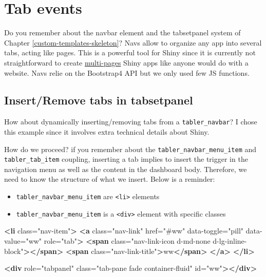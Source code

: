 \documentclass[]{book}
\newenvironment{Shaded}{\begin{snugshade}}{\end{snugshade}}
\newcommand{\KeywordTok}[1]{\textcolor[rgb]{0.13,0.29,0.53}{\textbf{#1}}}
\newcommand{\NormalTok}[1]{#1}
\newcommand{\OtherTok}[1]{\textcolor[rgb]{0.56,0.35,0.01}{#1}}
\newcommand{\StringTok}[1]{\textcolor[rgb]{0.31,0.60,0.02}{#1}}
\providecommand{\tightlist}{%
  \setlength{\itemsep}{0pt}\setlength{\parskip}{0pt}}
\begin{document}
\hypertarget{tab-events}{%
\section{Tab events}\label{tab-events}}

Do you remember about the navbar element and the tabsetpanel system of Chapter \ref{custom-templates-skeleton}? Navs allow to organize any app into several tabs, acting like pages. This is a powerful tool for Shiny since it is currently not straightforward to create \href{https://community.rstudio.com/t/shiny-app-composed-of-many-many-pages/7698}{multi-pages} Shiny apps like anyone would do with a website. Navs relie on the Bootstrap4 API but we only used few JS functions.

\hypertarget{insert-tabs}{%
\subsection{Insert/Remove tabs in tabsetpanel}\label{insert-tabs}}

How about dynamically inserting/removing tabs from a \texttt{tabler\_navbar}? I chose this example since it involves extra technical details about Shiny.

How do we proceed? if you remember about the \texttt{tabler\_navbar\_menu\_item} and \texttt{tabler\_tab\_item} coupling, inserting a tab implies to insert the trigger in the navigation menu as well as the content in the dashboard body. Therefore, we need to know the structure of what we insert. Below is a reminder:

\begin{itemize}
\tightlist
\item
  \texttt{tabler\_navbar\_menu\_item} are \texttt{\textless{}li\textgreater{}} elements
\item
  \texttt{tabler\_navbar\_menu\_item} is a \texttt{\textless{}div\textgreater{}} element with specific classes
\end{itemize}

\begin{Shaded}
\begin{Highlighting}[]
\KeywordTok{<li}\OtherTok{ class=}\StringTok{"nav-item"}\KeywordTok{>}
\KeywordTok{<a}\OtherTok{ class=}\StringTok{"nav-link"}\OtherTok{ href=}\StringTok{"#ww"}\OtherTok{ data-toggle=}\StringTok{"pill"}\OtherTok{ data-value=}\StringTok{"ww"}\OtherTok{ role=}\StringTok{"tab"}\KeywordTok{>}
\KeywordTok{<span}\OtherTok{ class=}\StringTok{"nav-link-icon d-md-none d-lg-inline-block"}\KeywordTok{></span>}
\KeywordTok{<span}\OtherTok{ class=}\StringTok{"nav-link-title"}\KeywordTok{>}\NormalTok{ww}\KeywordTok{</span>}
\KeywordTok{</a>}
\KeywordTok{</li>}

\KeywordTok{<div}\OtherTok{ role=}\StringTok{"tabpanel"}\OtherTok{ class=}\StringTok{"tab-pane fade container-fluid"}\OtherTok{ id=}\StringTok{"ww"}\KeywordTok{></div>}
\end{Highlighting}
\end{Shaded}
\end{document}
